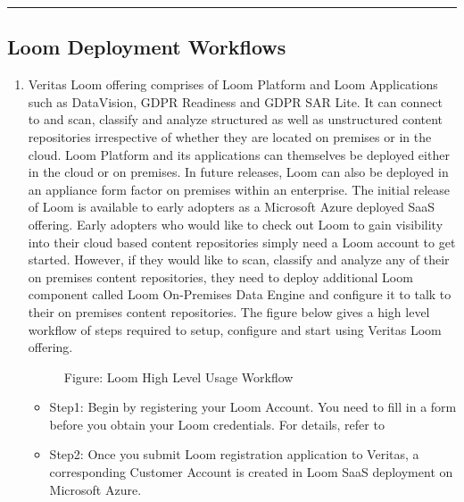 \documentclass[letterpaper,10pt,english]{sphinxmanual}
\begin{document}
\bigskip\hrule\bigskip



\subsection{Loom Deployment Workflows}
\label{\detokenize{loom_getting_started_guide:usage-wf-dep}}\label{\detokenize{loom_getting_started_guide:loom-deployment-workflows}}\begin{enumerate}
\item {} 

Veritas Loom offering comprises of Loom Platform and Loom Applications such as DataVision, GDPR Readiness and GDPR SAR Lite. It can connect to and scan, classify and analyze structured as well as unstructured content repositories irrespective of whether they are located on premises or in the cloud.  Loom Platform and its applications can themselves be deployed either in the cloud or on premises.  In future releases, Loom can also be deployed in an appliance form factor on premises within an enterprise.  The initial release of Loom is available to early adopters as a Microsoft Azure deployed SaaS offering. Early adopters who would like to check out Loom to gain visibility into their cloud based content repositories simply need a Loom account to get started. However, if they would like to scan, classify and analyze any of their on premises content repositories, they need to deploy additional Loom component called Loom On-Premises Data Engine and configure it to talk to their on premises content repositories.  The figure below gives a high level workflow of steps required to setup, configure and start using Veritas Loom offering.

\begin{figure}[htbp]
\centering
\capstart

\noindent{}
\caption{Figure: Loom High Level Usage Workflow}\label{\detokenize{loom_getting_started_guide:id48}}\end{figure}
\begin{itemize}
\item {} 
Step1: Begin by registering your Loom Account.  You need to fill in a form before you obtain your Loom credentials. For details, refer to 

\item {} 
Step2: Once you submit Loom registration application to Veritas, a corresponding Customer Account is created in Loom SaaS deployment on Microsoft Azure.


\end{itemize}
\end{enumerate}
\end{document}
